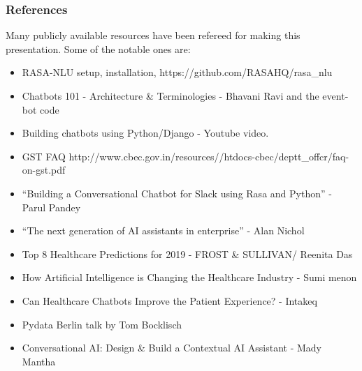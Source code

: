 \begin{frame}\frametitle{References}
Many publicly available resources have been refereed for making this presentation. Some of the notable ones are:
\footnotesize
\begin{itemize}
\item RASA-NLU setup, installation, https://github.com/RASAHQ/rasa\_nlu
\item Chatbots 101 - Architecture \& Terminologies -  Bhavani Ravi and the event-bot code
\item Building chatbots using Python/Django - Youtube video.
\item GST FAQ http://www.cbec.gov.in/resources//htdocs-cbec/deptt\_offcr/faq-on-gst.pdf
\item ``Building a Conversational Chatbot for Slack using Rasa and Python'' - Parul Pandey
\item ``The next generation of AI assistants in enterprise'' -  Alan Nichol
\item Top 8 Healthcare Predictions for 2019 - FROST \& SULLIVAN/ Reenita Das
\item How Artificial Intelligence is Changing the Healthcare Industry - Sumi menon
\item Can Healthcare Chatbots Improve the Patient Experience? - Intakeq
\item Pydata Berlin talk by Tom Bocklisch
\item Conversational AI: Design \& Build a Contextual AI Assistant - Mady Mantha
\end{itemize}
\end{frame}
